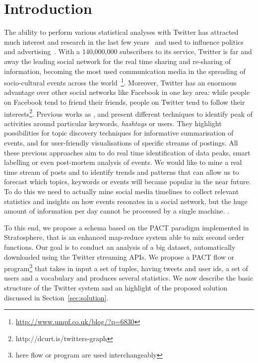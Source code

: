 \section{Introduction}
\label{sec:introduction}

The ability to perform various statistical analyses with Twitter has attracted much interest and research in the last few years~\cite{Hong:2012qy,Lehmann:2012kx} and used to influence politics~\cite{Tumasjan:2010vn} and advertising~\cite{Bakshy:2011ys}. 
With a 140,000,000 subscribers to its service, Twitter is far and away the leading social network for the real time sharing and re-sharing of information, becoming the most used communication media in the spreading of socio-cultural events across the world~\footnote{\url{http://www.umpf.co.uk/blog/?p=6830}}\cite{DBLP:journals:corr:abs-1003-2664}. 
Moreover, Twitter has an enormous advantage over other social networks like Facebook in one key area: while people on Facebook tend to friend their friends, people on Twitter tend to follow their interests\footnote{http://dcurt.is/twitters-graph}.
Previous works as \cite{DBLP:journals:corr:abs-1003-2664}, \cite{Mathioudakis:2010:EOI:1718487.1718525} and \cite{DBLP:conf:chi:MarcusBBKMM11} present different techniques to identify peak of activities around particular keywords, \emph{hashtags} or users.
They highlight possibilities for topic discovery techniques for informative summarisation of events, and for user-friendly visualisations of specific streams of postings.
All these previous approaches aim to do real time identification of data peaks, smart labelling or even post-mortem analysis of events.
We would like to mine a real time stream of posts and to identify trends and patterns that can allow us to forecast which topics, keywords or events will became popular in the near future.
To do this we need to actually mine social media timelines to collect relevant statistics and insights on how events resonates in a social network, but the huge amount of information per day cannot be processed by a single machine. .

To this end, we propose a schema based on the PACT paradigm implemented in Stratosphere, that is an enhanced map-reduce system able to mix second order functions. 
Our goal is to conduct an analysis of a big dataset, automatically downloaded using the Twitter streaming APIs.
We propose a PACT flow or program\footnote{here flow or program are used interchangeably} that takes in input a set of tuples, having tweets and user ids, a set of users and a vocabulary and produces several statistics. 
We now describe the basic structure of the Twitter system and an highlight of the proposed solution discussed in Section~\ref{sec:solution}. 

